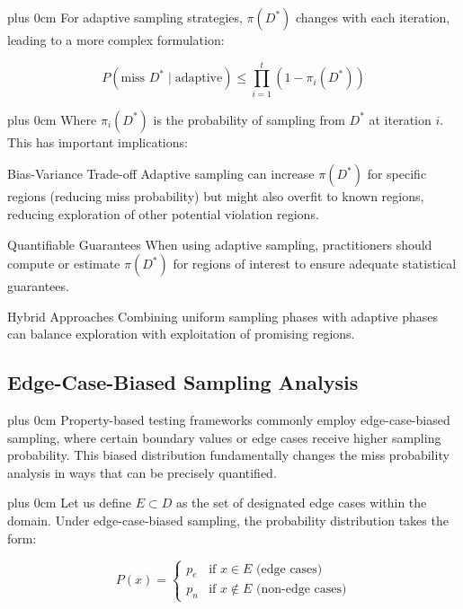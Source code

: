 \documentclass[conference]{IEEEtran}
\newcommand{\justifytext}{\leftskip=0pt \rightskip=0pt plus 0cm}
\begin{document}
\justifytext
For adaptive sampling strategies, $\pi(D^*)$ changes with each iteration, leading to a more complex formulation:

\begin{equation}
P(\text{miss } D^* \mid \text{adaptive}) \leq \prod_{i=1}^t (1 - \pi_i(D^*))
\end{equation}

\justifytext
Where $\pi_i(D^*)$ is the probability of sampling from $D^*$ at iteration $i$. This has important implications:

\begin{theorembox}{Bias-Variance Trade-off}
Adaptive sampling can increase $\pi(D^*)$ for specific regions (reducing miss probability) but might also overfit to known regions, reducing exploration of other potential violation regions.
\end{theorembox}

\begin{theorembox}{Quantifiable Guarantees}
When using adaptive sampling, practitioners should compute or estimate $\pi(D^*)$ for regions of interest to ensure adequate statistical guarantees.
\end{theorembox}

\begin{theorembox}{Hybrid Approaches}
Combining uniform sampling phases with adaptive phases can balance exploration with exploitation of promising regions.
\end{theorembox}

\subsection{Edge-Case-Biased Sampling Analysis}

\justifytext
Property-based testing frameworks commonly employ edge-case-biased sampling, where certain boundary values or edge cases receive higher sampling probability. This biased distribution fundamentally changes the miss probability analysis in ways that can be precisely quantified.

\justifytext
Let us define $E \subset D$ as the set of designated edge cases within the domain. Under edge-case-biased sampling, the probability distribution takes the form:

\begin{equation}
P(x) = \begin{cases}
p_e & \text{if } x \in E \text{ (edge cases)} \\
p_n & \text{if } x \notin E \text{ (non-edge cases)}
\end{cases}
\end{equation}
\end{document}

